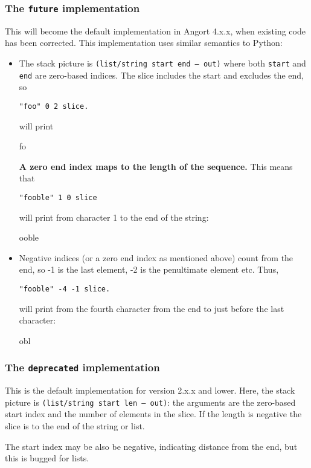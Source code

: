 \subsubsection{The \texttt{future} implementation}
This will become the default implementation in Angort 4.x.x, when
existing code has been corrected. This implementation uses similar
semantics to Python:
\begin{itemize}
\item The stack picture is \texttt{(list/string start end -- out)} where both \texttt{start} and \texttt{end} 
are zero-based indices. The slice includes the start and excludes the end,
so 
\begin{lstlisting}
"foo" 0 2 slice.
\end{lstlisting}
will print
\begin{v}
fo
\end{v}
\textbf{A zero end index maps to the length of the sequence.} This means that
\begin{lstlisting}
"fooble" 1 0 slice
\end{lstlisting}
will print from character 1 to the end of the string:
\begin{v}
ooble
\end{v}

\item Negative indices (or a zero end index as mentioned above) count from the end, so -1 is the last element, -2
is the penultimate element etc. Thus, 
\begin{lstlisting}
"fooble" -4 -1 slice.
\end{lstlisting}
will print from the fourth character from the end to just before the last character:
\begin{v}
obl
\end{v}
\end{itemize}
    




\subsubsection{The \texttt{deprecated} implementation}
This is the default implementation for version 2.x.x and lower.
Here, the stack picture is \texttt{(list/string start len -- out)}: the arguments
are the zero-based start index and the number of elements in the slice.
If the length is negative the slice is to the end of the string or list.

The start index may be also be negative, indicating distance from the
end, but this is bugged for lists.



